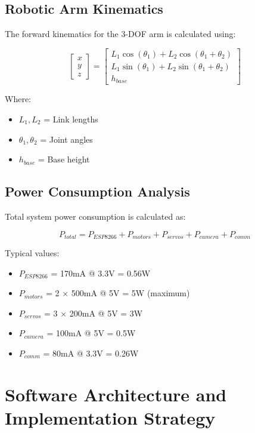 \subsection{Robotic Arm Kinematics}
The forward kinematics for the 3-DOF arm is calculated using:

\begin{equation}
\begin{bmatrix}
x \\
y \\
z
\end{bmatrix}
=
\begin{bmatrix}
L_1 \cos(\theta_1) + L_2 \cos(\theta_1 + \theta_2) \\
L_1 \sin(\theta_1) + L_2 \sin(\theta_1 + \theta_2) \\
h_{base}
\end{bmatrix}
\end{equation}

Where:
\begin{itemize}
\item $L_1, L_2$ = Link lengths
\item $\theta_1, \theta_2$ = Joint angles
\item $h_{base}$ = Base height
\end{itemize}

\subsection{Power Consumption Analysis}
Total system power consumption is calculated as:

\begin{equation}
P_{total} = P_{ESP8266} + P_{motors} + P_{servos} + P_{camera} + P_{comm}
\end{equation}

Typical values:
\begin{itemize}
\item $P_{ESP8266}$ = 170mA @ 3.3V = 0.56W
\item $P_{motors}$ = 2 × 500mA @ 5V = 5W (maximum)
\item $P_{servos}$ = 3 × 200mA @ 5V = 3W
\item $P_{camera}$ = 100mA @ 5V = 0.5W
\item $P_{comm}$ = 80mA @ 3.3V = 0.26W
\end{itemize}

\section{Software Architecture and Implementation Strategy}

